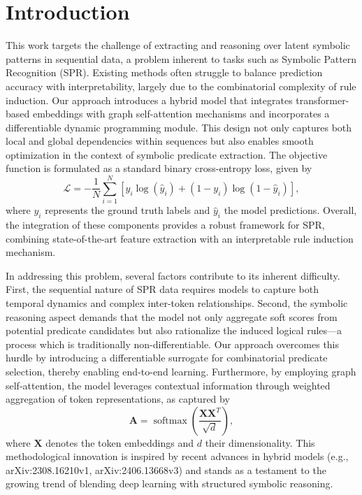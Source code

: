 \documentclass{article}
\begin{document}
\section{Introduction}
This work targets the challenge of extracting and reasoning over latent symbolic patterns in sequential data, a problem inherent to tasks such as Symbolic Pattern Recognition (SPR). Existing methods often struggle to balance prediction accuracy with interpretability, largely due to the combinatorial complexity of rule induction. Our approach introduces a hybrid model that integrates transformer-based embeddings with graph self-attention mechanisms and incorporates a differentiable dynamic programming module. This design not only captures both local and global dependencies within sequences but also enables smooth optimization in the context of symbolic predicate extraction. The objective function is formulated as a standard binary cross-entropy loss, given by
\[
\mathcal{L} = -\frac{1}{N}\sum_{i=1}^{N}\left[y_i\log(\hat{y}_i)+(1-y_i)\log(1-\hat{y}_i)\right],
\]
where \( y_i \) represents the ground truth labels and \( \hat{y}_i \) the model predictions. Overall, the integration of these components provides a robust framework for SPR, combining state-of-the-art feature extraction with an interpretable rule induction mechanism.

In addressing this problem, several factors contribute to its inherent difficulty. First, the sequential nature of SPR data requires models to capture both temporal dynamics and complex inter-token relationships. Second, the symbolic reasoning aspect demands that the model not only aggregate soft scores from potential predicate candidates but also rationalize the induced logical rules—a process which is traditionally non-differentiable. Our approach overcomes this hurdle by introducing a differentiable surrogate for combinatorial predicate selection, thereby enabling end-to-end learning. Furthermore, by employing graph self-attention, the model leverages contextual information through weighted aggregation of token representations, as captured by
\[
\mathbf{A} = \operatorname{softmax}\!\left(\frac{\mathbf{X}\mathbf{X}^T}{\sqrt{d}}\right),
\]
where \(\mathbf{X}\) denotes the token embeddings and \(d\) their dimensionality. This methodological innovation is inspired by recent advances in hybrid models (e.g., arXiv:2308.16210v1, arXiv:2406.13668v3) and stands as a testament to the growing trend of blending deep learning with structured symbolic reasoning.
\end{document}
